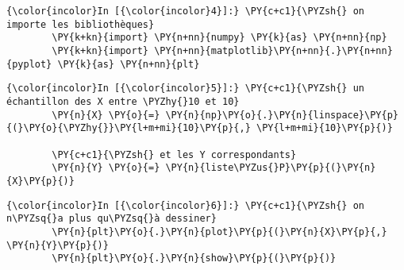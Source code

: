     \begin{Verbatim}[commandchars=\\\{\}]
{\color{incolor}In [{\color{incolor}4}]:} \PY{c+c1}{\PYZsh{} on importe les bibliothèques}
        \PY{k+kn}{import} \PY{n+nn}{numpy} \PY{k}{as} \PY{n+nn}{np}
        \PY{k+kn}{import} \PY{n+nn}{matplotlib}\PY{n+nn}{.}\PY{n+nn}{pyplot} \PY{k}{as} \PY{n+nn}{plt}
\end{Verbatim}


    \begin{Verbatim}[commandchars=\\\{\}]
{\color{incolor}In [{\color{incolor}5}]:} \PY{c+c1}{\PYZsh{} un échantillon des X entre \PYZhy{}10 et 10}
        \PY{n}{X} \PY{o}{=} \PY{n}{np}\PY{o}{.}\PY{n}{linspace}\PY{p}{(}\PY{o}{\PYZhy{}}\PY{l+m+mi}{10}\PY{p}{,} \PY{l+m+mi}{10}\PY{p}{)}
        
        \PY{c+c1}{\PYZsh{} et les Y correspondants}
        \PY{n}{Y} \PY{o}{=} \PY{n}{liste\PYZus{}P}\PY{p}{(}\PY{n}{X}\PY{p}{)}
\end{Verbatim}


    \begin{Verbatim}[commandchars=\\\{\}]
{\color{incolor}In [{\color{incolor}6}]:} \PY{c+c1}{\PYZsh{} on n\PYZsq{}a plus qu\PYZsq{}à dessiner}
        \PY{n}{plt}\PY{o}{.}\PY{n}{plot}\PY{p}{(}\PY{n}{X}\PY{p}{,} \PY{n}{Y}\PY{p}{)}
        \PY{n}{plt}\PY{o}{.}\PY{n}{show}\PY{p}{(}\PY{p}{)}
\end{Verbatim}


    \begin{center}
    \end{center}
    { \hspace*{\fill} \\}
    

    
    
    
